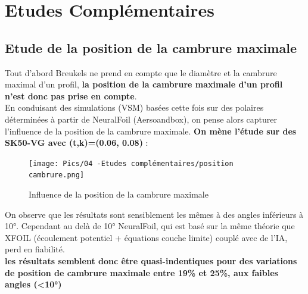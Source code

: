 
\chapter{Etudes Complémentaires} 	
\label{Chapter4} 		



\section{Etude de la position de la cambrure maximale}
\label{sec:Ch4.1}

Tout d'abord Breukels ne prend en compte que le diamètre et la cambrure maximal d'un profil, \textbf{la position de la cambrure maximale d'un profil n'est donc pas prise en compte}. \\
En conduisant des simulations (VSM) basées cette fois sur des polaires déterminées à partir de NeuralFoil (Aersoandbox), on pense alors capturer l'influence de la position de la cambrure maximale. \textbf{On mène l'étude  sur des SK50-VG avec (t,k)=(0.06, 0.08)} :

\begin{figure}[H]
    \centering
    \texttt{[image: Pics/04 -Etudes complémentaires/position cambrure.png]}  
    \caption{Influence de la position de la cambrure maximale}
    \label{fig:influence cambrure position}
\end{figure}

On observe que les résultats sont sensiblement les mêmes à des angles inférieurs à 10°. Cependant au delà de 10° NeuralFoil, qui est basé sur la même théorie que XFOIL (écoulement potentiel + équations couche limite) couplé avec de l'IA, perd en fiabilité. \\
\textbf{les résultats semblent donc être quasi-indentiques pour des variations de position de cambrure maximale entre 19\% et 25\%, aux faibles angles (<10°)}

